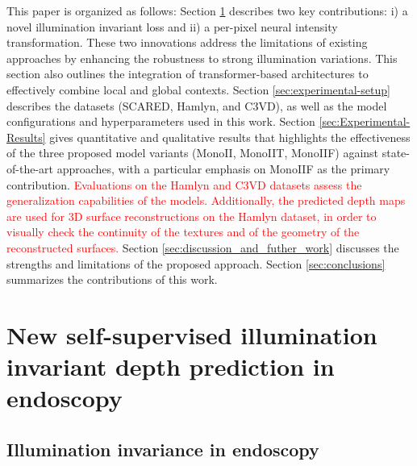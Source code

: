 \documentclass[a4paper,fleqn]{cas-dc}
\begin{document}
This paper is organized as follows: Section \ref{sec:methods_and_data} describes two key contributions: i) a novel illumination invariant loss and ii) a per-pixel neural intensity transformation. These two innovations address the limitations of existing approaches by enhancing the robustness to strong illumination variations. This section also outlines the integration of transformer-based architectures to effectively combine local and global contexts. Section \ref{sec:experimental-setup} describes the datasets (SCARED, Hamlyn, and C3VD), as well as the model configurations and hyperparameters used in this work. Section \ref{sec:Experimental-Results} gives quantitative and qualitative results that highlights the effectiveness of the three proposed model variants (MonoII, MonoIIT, MonoIIF) against state-of-the-art approaches, with a particular emphasis on MonoIIF as the primary contribution. \textcolor{red}{Evaluations on the Hamlyn and C3VD datasets assess the generalization capabilities of the models. Additionally, the predicted depth maps are used for 3D surface reconstructions on the Hamlyn dataset, in order to visually check the continuity of the textures and of the geometry of the reconstructed surfaces.} Section \ref{sec:discussion_and_futher_work} discusses the strengths and limitations of the proposed approach. Section \ref{sec:conclusions} summarizes the contributions of this work. 

\section{New self-supervised illumination invariant
 depth prediction in endoscopy}
\label{sec:methods_and_data}

\subsection{Illumination invariance in endoscopy \label{sec:illumination_models}}
\end{document}
